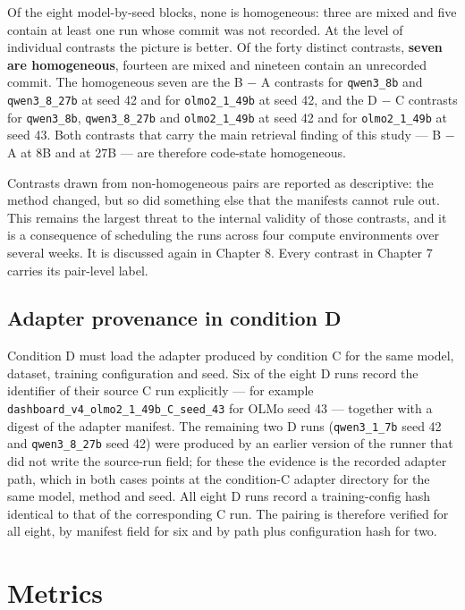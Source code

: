 Of the eight model-by-seed blocks, none is homogeneous: three are mixed and five contain at least one run whose commit was not recorded. At the level of individual contrasts the picture is better. Of the forty distinct contrasts, \textbf{seven are homogeneous}, fourteen are mixed and nineteen contain an unrecorded commit. The homogeneous seven are the B \ensuremath{-} A contrasts for \texttt{qwen3\_8b} and \texttt{qwen3\_8\_27b} at seed 42 and for \texttt{olmo2\_1\_49b} at seed 42, and the D \ensuremath{-} C contrasts for \texttt{qwen3\_8b}, \texttt{qwen3\_8\_27b} and \texttt{olmo2\_1\_49b} at seed 42 and for \texttt{olmo2\_1\_49b} at seed 43. Both contrasts that carry the main retrieval finding of this study --- B \ensuremath{-} A at 8B and at 27B --- are therefore code-state homogeneous.

Contrasts drawn from non-homogeneous pairs are reported as descriptive: the method changed, but so did something else that the manifests cannot rule out. This remains the largest threat to the internal validity of those contrasts, and it is a consequence of scheduling the runs across four compute environments over several weeks. It is discussed again in Chapter 8. Every contrast in Chapter 7 carries its pair-level label.

\subsection{Adapter provenance in condition D}

Condition D must load the adapter produced by condition C for the same model, dataset, training configuration and seed. Six of the eight D runs record the identifier of their source C run explicitly --- for example \nolinkurl{dashboard_v4_olmo2_1_49b_C_seed_43} for OLMo seed 43 --- together with a digest of the adapter manifest. The remaining two D runs (\texttt{qwen3\_1\_7b} seed 42 and \texttt{qwen3\_8\_27b} seed 42) were produced by an earlier version of the runner that did not write the source-run field; for these the evidence is the recorded adapter path, which in both cases points at the condition-C adapter directory for the same model, method and seed. All eight D runs record a training-config hash identical to that of the corresponding C run. The pairing is therefore verified for all eight, by manifest field for six and by path plus configuration hash for two.

\section{Metrics}

